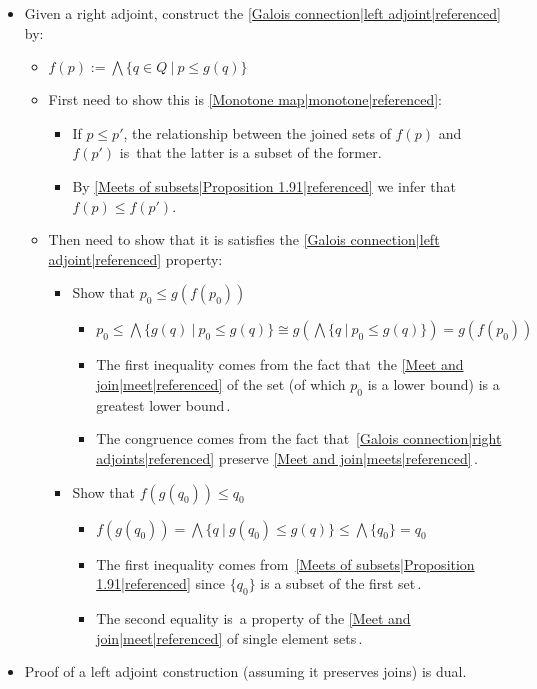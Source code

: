 \begin{itemize}
    \item Given a right adjoint, construct the \ref{Galois connection|left adjoint|referenced} by:
          \begin{itemize}
            \item $f(p) := \bigwedge\{q \in Q\ |\ p \leq g(q)\}$
            \item First need to show this is \ref{Monotone map|monotone|referenced}:
                  \begin{itemize}
                    \item If $p \leq p'$, the relationship between the joined sets of $f(p)$ and $f(p')$ is \,that the latter is a subset of the former.\,
                    \item By \ref{Meets of subsets|Proposition 1.91|referenced} we infer that $f(p) \leq f(p')$.
                  \end{itemize}
            \item Then need to show that it is satisfies the \ref{Galois connection|left adjoint|referenced} property:
                  \begin{itemize}
                    \item Show that $p_0 \leq g(f(p_0))$
                          \begin{itemize}
                            \item  $p_0 \leq \bigwedge \{g(q)\ |\ p_0 \leq g(q)\} \cong g(\bigwedge\{q\ |\ p_0 \leq g(q)\}) = g(f(p_0))$
                            \item The first inequality comes from the fact that \,the \ref{Meet and join|meet|referenced} of the set (of which $p_0$ is a lower bound) is a greatest lower bound\,.
                            \item The congruence comes from the fact that \,\ref{Galois connection|right adjoints|referenced} preserve \ref{Meet and join|meets|referenced}\,.
                          \end{itemize}
                    \item Show that $f(g(q_0)) \leq q_0$
                          \begin{itemize}
                            \item $f(g(q_0)) = \bigwedge\{q\ |\ g(q_0) \leq g(q)\} \leq \bigwedge \{q_0\} = q_0$
                            \item The first inequality comes from \,\ref{Meets of subsets|Proposition 1.91|referenced} since $\{q_0\}$ is a subset of the first set\,.
                            \item The second equality is \,a property of the \ref{Meet and join|meet|referenced} of single element sets\,.                \end{itemize}
                  \end{itemize}              \end{itemize}
    \item Proof of a left adjoint construction (assuming it preserves joins) is dual.      \end{itemize}


